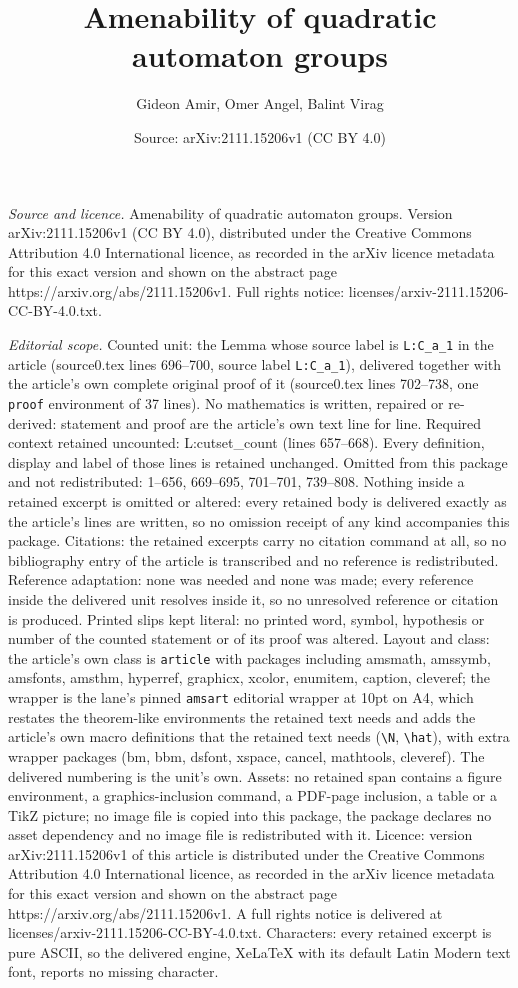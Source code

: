 \documentclass[10pt,a4paper]{amsart}
\title[Amenability of quadratic automaton groups]{Amenability of quadratic automaton groups}
\author{Gideon Amir, Omer Angel, Balint Virag}
\date{Source: arXiv:2111.15206v1 (CC BY 4.0)}
\begin{document}
\maketitle

\noindent\emph{Source and licence.} Amenability of quadratic automaton groups. Version arXiv:2111.15206v1 (CC BY 4.0), distributed under the Creative Commons Attribution 4.0 International licence, as recorded in the arXiv licence metadata for this exact version and shown on the abstract page https://arxiv.org/abs/2111.15206v1. Full rights notice: licenses/arxiv-2111.15206-CC-BY-4.0.txt.\par\smallskip

\noindent\textit{Editorial scope.} Counted unit: the Lemma whose source label is \texttt{L:C\_a\_1} in the article (source0.tex lines 696--700, source label \texttt{L:C\_a\_1}), delivered together with the article's own complete original proof of it (source0.tex lines 702--738, one \texttt{proof} environment of 37 lines). No mathematics is written, repaired or re-derived: statement and proof are the article's own text line for line. Required context retained uncounted: L:cutset\_count (lines 657--668). Every definition, display and label of those lines is retained unchanged. Omitted from this package and not redistributed: 1--656, 669--695, 701--701, 739--808. Nothing inside a retained excerpt is omitted or altered: every retained body is delivered exactly as the article's lines are written, so no omission receipt of any kind accompanies this package. Citations: the retained excerpts carry no citation command at all, so no bibliography entry of the article is transcribed and no reference is redistributed. Reference adaptation: none was needed and none was made; every reference inside the delivered unit resolves inside it, so no unresolved reference or citation is produced. Printed slips kept literal: no printed word, symbol, hypothesis or number of the counted statement or of its proof was altered. Layout and class: the article's own class is \texttt{article} with packages including amsmath, amssymb, amsfonts, amsthm, hyperref, graphicx, xcolor, enumitem, caption, cleveref; the wrapper is the lane's pinned \texttt{amsart} editorial wrapper at 10pt on A4, which restates the theorem-like environments the retained text needs and adds the article's own macro definitions that the retained text needs (\texttt{\textbackslash N}, \texttt{\textbackslash hat}), with extra wrapper packages (bm, bbm, dsfont, xspace, cancel, mathtools, cleveref). The delivered numbering is the unit's own. Assets: no retained span contains a figure environment, a graphics-inclusion command, a PDF-page inclusion, a table or a TikZ picture; no image file is copied into this package, the package declares no asset dependency and no image file is redistributed with it. Licence: version arXiv:2111.15206v1 of this article is distributed under the Creative Commons Attribution 4.0 International licence, as recorded in the arXiv licence metadata for this exact version and shown on the abstract page https://arxiv.org/abs/2111.15206v1. A full rights notice is delivered at licenses/arxiv-2111.15206-CC-BY-4.0.txt. Characters: every retained excerpt is pure ASCII, so the delivered engine, XeLaTeX with its default Latin Modern text font, reports no missing character.
\end{document}
